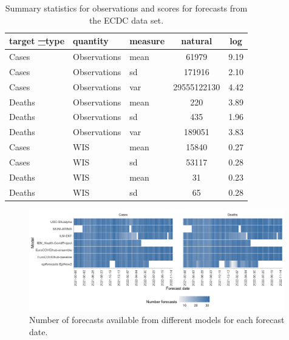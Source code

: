 \documentclass{article}
\providecommand{\DIFdeltex}[1]{{\protect\color{red}\sout{#1}}}                      %
\providecommand{\DIFdelFL}[1]{\DIFdel{#1}} %
\providecommand{\DIFdelbeginFL}{} %
\providecommand{\DIFdelendFL}{} %
\providecommand{\DIFdel}[1]{\texorpdfstring{\DIFdeltex{#1}}{}} %
\newcommand{\DIFscaledelfig}{0.5}
\newlength{\DIFdelgraphicswidth} %
\newlength{\DIFdelgraphicsheight} %
\newcommand{\DIFdelincludegraphics}[2][]{%
\sbox{\DIFdelgraphicsbox}{\DIFOincludegraphics[#1]{#2}}%
\settoboxwidth{\DIFdelgraphicswidth}{\DIFdelgraphicsbox} %
\settoboxtotalheight{\DIFdelgraphicsheight}{\DIFdelgraphicsbox} %
\scalebox{\DIFscaledelfig}{%
\parbox[b]{\DIFdelgraphicswidth}{\usebox{\DIFdelgraphicsbox}\\[-\baselineskip] \rule{\DIFdelgraphicswidth}{0em}}\llap{\resizebox{\DIFdelgraphicswidth}{\DIFdelgraphicsheight}{%
\setlength{\unitlength}{\DIFdelgraphicswidth}%
\begin{picture}(1,1)%
\thicklines\linethickness{2pt} %
{\color[rgb]{1,0,0}\put(0,0){\framebox(1,1){}}}%
{\color[rgb]{1,0,0}\put(0,0){\line( 1,1){1}}}%
{\color[rgb]{1,0,0}\put(0,1){\line(1,-1){1}}}%
\end{picture}%
}\hspace*{3pt}}} %
} %
\DeclareRobustCommand{\DIFdelbeginFL}{\DIFOdelbeginFL \let\includegraphics\DIFdelincludegraphics} %
\DeclareRobustCommand{\DIFdelendFL}{\DIFOaddendFL \let\includegraphics\DIFOincludegraphics} %
\begin{document}
\begin{table}[h!]
    \centering
\begin{tabular}{lllcc}
\toprule
target \DIFdelbeginFL \DIFdelFL{\_}\DIFdelendFL type & quantity & measure & natural & log\\
\midrule
Cases & Observations & mean & 61979 & 9.19\\
Cases & Observations & sd & 171916 & 2.10\\
Cases & Observations & var & 29555122130 & 4.42\\
Deaths & Observations & mean & 220 & 3.89\\
Deaths & Observations & sd & 435 & 1.96\\
\addlinespace
Deaths & Observations & var & 189051 & 3.83\\
Cases & WIS & mean & 15840 & 0.27\\
Cases & WIS & sd & 53117 & 0.28\\
Deaths & WIS & mean & 31 & 0.23\\
Deaths & WIS & sd & 65 & 0.28\\
\bottomrule
\end{tabular}
    \caption{Summary statistics for observations and scores for forecasts from the ECDC data set.}
    \label{tab:HUB-summary}
\end{table}

\begin{figure}[h!]
    \centering
    \includegraphics[width=0.99\textwidth]{output/figures/number-avail-forecasts.png}
    \caption{
    Number of forecasts available from different models for each forecast date. 
    }
    \label{fig:HUB-num-avail-models}
\end{figure}
\end{document}
